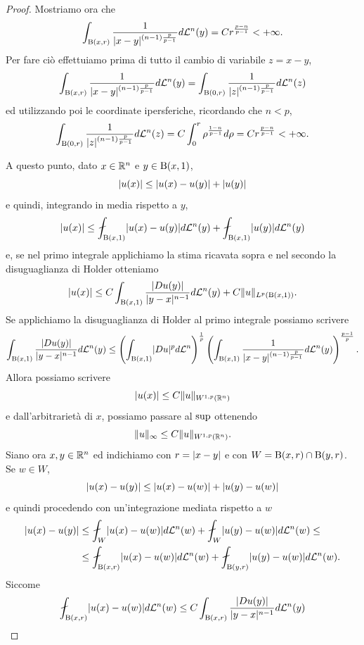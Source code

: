 \begin{teorema}
\begin{proof}
		Mostriamo ora che 
		\[ \int_{\textup{B}(x,r)} \dfrac{1}{\lvert x-y\rvert^{(n-1)\frac{p}{p-1}}}d\mathcal{L}^n(y) = C r^{\frac{p-n}{p-1}} < +\infty. \]
		Per fare ciò effettuiamo prima di tutto il cambio di variabile $z = x-y$,
		\[ \int_{\textup{B}(x,r)} \dfrac{1}{\lvert x-y\rvert^{(n-1)\frac{p}{p-1}}}d\mathcal{L}^n(y) = \int_{\textup{B}(0,r)} \dfrac{1}{\lvert z\rvert^{(n-1)\frac{p}{p-1}}}d\mathcal{L}^n(z)\]
		ed utilizzando poi le coordinate ipersferiche, ricordando che $n<p$,
		\[ \int_{\textup{B}(0,r)} \dfrac{1}{\lvert z\rvert^{(n-1)\frac{p}{p-1}}}d\mathcal{L}^n(z) = C\int_{0}^{r} \rho^{\frac{1-n}{p-1}}d\rho = Cr^{\frac{p-n}{p-1}} < +\infty.  \]
		
		A questo punto, dato $x \in \mathbb{R}^n$ e $y \in \textup{B}(x,1)$,
		\[ \lvert u(x)\rvert \le \lvert u(x) - u(y)\rvert + \lvert u(y)\rvert \]
		e quindi, integrando in media rispetto a $y$,
		\[ \abs{u(x)} \le \fint_{\textup{B}(x,1)}\abs{u(x) - u(y)} d\mathcal{L}^n(y) +  \fint_{\textup{B}(x,1)}\abs{u(y)} d\mathcal{L}^n(y)\]
		e, se nel primo integrale applichiamo la stima ricavata sopra e nel secondo la disuguaglianza di Holder otteniamo 
		\[ \lvert u(x)\rvert \le C\int_{\textup{B}(x,1)} \frac{\lvert Du(y)\rvert}{\lvert y-x\rvert^{n-1}}d\mathcal{L}^n(y) + C\lVert u\rVert_{L^{p}(\textup{B}(x,1))}. \]
		Se applichiamo la disuguaglianza di Holder al primo integrale possiamo scrivere
		\[ \int_{\textup{B}(x,1)} \frac{\lvert Du(y)\rvert}{\lvert y-x\rvert^{n-1}}d\mathcal{L}^n(y) \le \left( \int_{\textup{B}(x,1)} \lvert Du\rvert^pd\mathcal{L}^n\right) ^{\frac{1}{p}}\left( \int_{\textup{B}(x,1)} \dfrac{1}{\lvert x-y\rvert^{(n-1)\frac{p}{p-1}}} d\mathcal{L}^n(y) \right)^{\frac{p-1}{p}}.\]
		Allora possiamo scrivere
		\[ \lvert u(x)\rvert \le C\lVert u\rVert_{W^{1,p}(\mathbb{R}^n)} \]
		e dall'arbitrarietà di $x$, possiamo passare al $\textup{sup}$ ottenendo
		\begin{equation}\label{stimanormainfty}
			\lVert u\rVert_{\infty} \le C\lVert u\rVert_{W^{1,p}(\mathbb{R}^n)}. 
		\end{equation}
		\indent Siano ora $x,y \in \mathbb{R}^n$ ed indichiamo con $r = \lvert x-y\rvert$ e con $W = \textup{B}(x,r) \cap \textup{B}(y,r)$. Se $w \in W$,
		\[ \lvert u(x)-u(y)\rvert \le \lvert u(x)-u(w)\rvert + \lvert u(y)-u(w)\rvert\]
		e quindi procedendo con un'integrazione mediata rispetto a $w$
		\begin{align*}
			\abs{u(x)-u(y)} &\le \fint_{W}\abs{u(x)-u(w)}d\mathcal{L}^n(w) + \fint_{W}\abs{u(y)-u(w)}d\mathcal{L}^n(w) \le \\
			& \le \fint_{\textup{B}(x,r)}\abs{u(x)-u(w)}d\mathcal{L}^n(w) + \fint_{\textup{B}(y,r)}\abs{u(y)-u(w)}d\mathcal{L}^n(w).
		\end{align*}
		Siccome
		\[\fint_{\textup{B}(x,r)}\abs{u(x)-u(w)}d\mathcal{L}^n(w) \le C\int_{\textup{B}(x,r)} \frac{\abs{Du(y)}}{\abs{y-x}^{n-1}}d\mathcal{L}^n(y)   \]

\end{proof}
\end{teorema}
